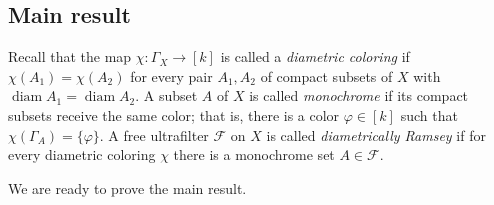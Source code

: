 \subsection{Main result} Recall that the map \( \chi : \Gamma_{X}  \to [k] \) is called a \emph{diametric coloring} if \( \chi (A_1) = \chi (A_2) \) for every pair \( A_1, A_2 \) of compact subsets of \( X \) with \( \operatorname{diam} A_1 = \operatorname{diam} A_2  \). A subset \( A \) of \( X \) is called \emph{monochrome} if its compact subsets receive the same color; that is, there is a color \( \varphi \in [k] \) such that \( \chi (\Gamma_{A} ) = \{ \varphi  \}  \). A free ultrafilter \( \mathcal{F}  \) on \( X \) is called \emph{diametrically Ramsey} if for every diametric coloring \( \chi \) there is a monochrome set \( A  \in \mathcal{F}  \).

We are ready to prove the main result.

